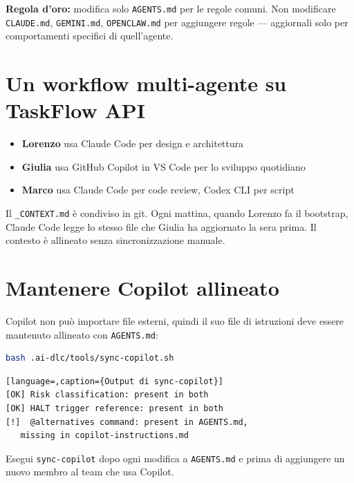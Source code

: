 \begin{tipbox}
\textbf{Regola d'oro:} modifica solo \texttt{AGENTS.md} per le regole comuni. Non modificare \texttt{CLAUDE.md}, \texttt{GEMINI.md}, \texttt{OPENCLAW.md} per aggiungere regole --- aggiornali solo per comportamenti specifici di quell'agente.
\end{tipbox}

\section{Un workflow multi-agente su TaskFlow API}
\label{sec:14-workflow}

\begin{itemize}
  \item \textbf{Lorenzo} usa Claude Code per design e architettura
  \item \textbf{Giulia} usa GitHub Copilot in VS Code per lo sviluppo quotidiano
  \item \textbf{Marco} usa Claude Code per code review, Codex CLI per script
\end{itemize}

Il \texttt{\_CONTEXT.md} è condiviso in git. Ogni mattina, quando Lorenzo fa il bootstrap, Claude Code legge lo stesso file che Giulia ha aggiornato la sera prima. Il contesto è allineato senza sincronizzazione manuale.

\section{Mantenere Copilot allineato}
\label{sec:14-sync-copilot}

Copilot non può importare file esterni, quindi il suo file di istruzioni deve essere mantenuto allineato con \texttt{AGENTS.md}:

\begin{lstlisting}[language=bash,caption={Verifica allineamento Copilot}]
bash .ai-dlc/tools/sync-copilot.sh
\end{lstlisting}

\begin{lstlisting}[language=,caption={Output di sync-copilot}]
[OK] Risk classification: present in both
[OK] HALT trigger reference: present in both
[!]  @alternatives command: present in AGENTS.md,
   missing in copilot-instructions.md
\end{lstlisting}

Esegui \texttt{sync-copilot} dopo ogni modifica a \texttt{AGENTS.md} e prima di aggiungere un nuovo membro al team che usa Copilot.

